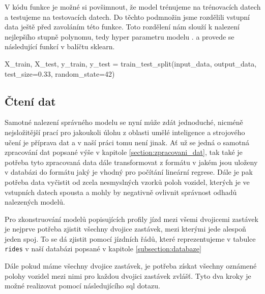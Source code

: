 \bigbreak

V kódu funkce je možné si povšimnout, že model trénujeme na trénovacích datech a testujeme na testovacích datech. Do těchto podmnožin jsme rozdělili vstupní data ještě před zavoláním této funkce. Toto rozdělení nám slouží k nalezení nejlepšího stupně polynomu, tedy hyper parametru modelu \citep[viz][Strana 365, validation set a training set]{Ripley96}. a provede se následující funkcí v balíčtu sklearn.

\begin{code}[frame=none]
X_train, X_test, y_train, y_test =
  train_test_split(input_data,
  output_data, test_size=0.33, random_state=42)
\end{code}


\subsection{Čtení dat} \label{subsection:cteni_dat}

Samotné nalezení správného modelu se nyní může zdát jednoduché, nicméně nejsložitější prací pro jakoukoli úlohu z oblasti umělé inteligence a strojového učení je příprava dat a v naší práci tomu není jinak. Ať už se jedná o samotná zpracování dat popsané výše v kapitole \ref{section:zpracovani_dat}, tak také je potřeba tyto zpracovaná data dále transformovat z formátu v jakém jsou uloženy v databázi do formátu jaký je vhodný pro počítání lineární regrese. Dále je pak potřeba data vyčistit od zcela nesmyslných vzorků poloh vozidel, kterých je ve vstupních datech spousta a mohly by negativně ovlivnit správnost odhadů nalezených modelů.

\bigbreak

Pro zkonstruování modelů popisujících profily jízd mezi všemi dvojicemi zastávek je nejprve potřeba zjistit všechny dvojice zastávek, mezi kterými jede alespoň jeden spoj. To se dá zjistit pomocí jízdních řádů, které reprezentujeme v tabulce \verb-rides- v naší databázi popsané v kapitole \ref{subsection:databaze}


\bigbreak


 Dále pokud máme všechny dvojice zastávek, je potřeba získat všechny oznámené polohy vozidel mezi nimi pro každou dvojici zastávek zvlášť. Tyto dva kroky je možné realizovat pomocí následujícího \gls{sql} dotazu.


